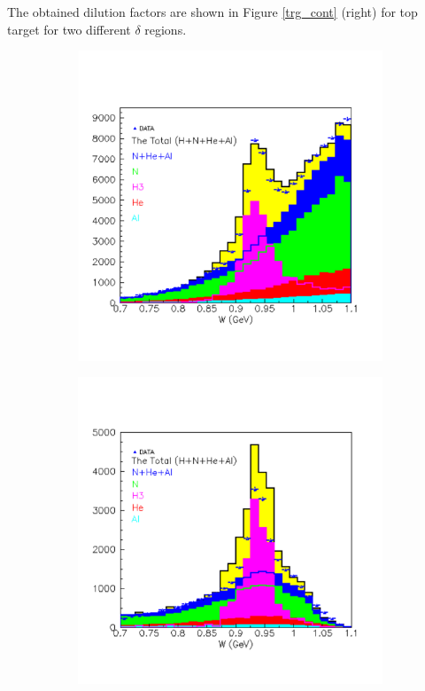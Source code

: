 \documentclass[12pt]{article}
\begin{document}
The obtained dilution factors are shown in Figure \ref{trg_cont} (right) for top target for two different $\delta$ regions.
\begin{figure}[htbp]
\centering
        \begin{subfigure}[htbp]{0.31\textwidth}
               \centering
               \includegraphics[width=\textwidth]{trg_cont810}
                \label{trg_cont810}
      \end{subfigure}
          \begin{subfigure}[htbp]{0.31\textwidth}
                \centering
               \includegraphics[width=\textwidth]{trg_cont1012}

\end{subfigure}
\end{figure}
\end{document}
